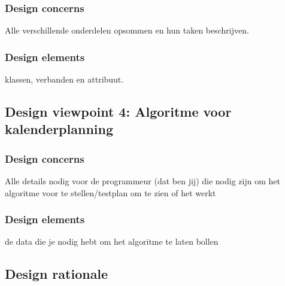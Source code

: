 \documentclass{article}
\begin{document}
\subsubsection{Design concerns}
Alle verschillende onderdelen opsommen en hun taken beschrijven.
\subsubsection{Design elements}
klassen, verbanden en attribuut.


\subsection{Design viewpoint 4: Algoritme voor kalenderplanning}
\subsubsection{Design concerns}
Alle details nodig voor de programmeur (dat ben jij) die nodig zijn om het algoritme voor te stellen/testplan om te zien of het werkt
\subsubsection{Design elements}
de data die je nodig hebt om het algoritme te laten bollen

\subsection{}



\subsection{Design rationale}






 
\end{document}
